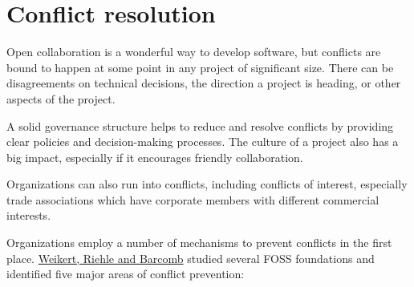 


\chapter{Conflict resolution}

Open collaboration is a wonderful way to develop software, but conflicts are bound to happen at some point in any project of significant size.  There can be disagreements on technical decisions, the direction a project is heading, or other aspects of the project.

A solid governance structure helps to reduce and resolve conflicts by providing clear policies and decision-making processes.  The culture of a project also has a big impact, especially if it encourages friendly collaboration.

Organizations can also run into conflicts, including conflicts of interest, especially trade associations which have corporate members with different commercial interests.

Organizations employ a number of mechanisms to prevent conflicts in the first place.  \href{https://doi.org/10.1007/978-3-030-33742-1_11}{Weikert, Riehle and Barcomb} studied several FOSS foundations and identified five major areas of conflict prevention:

